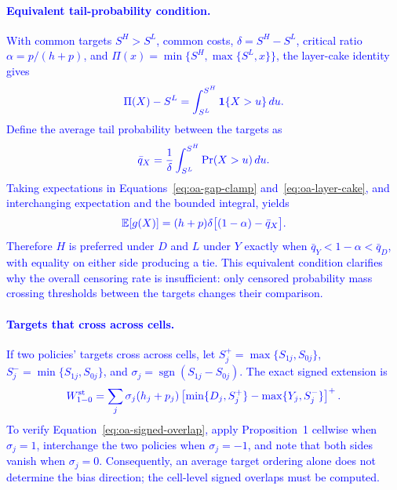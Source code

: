 \documentclass[msom,dblanonrev]{informs4}
\newcommand{\add}[1]{\textcolor{blue}{#1}}
\begin{document}
\paragraph{\add{Equivalent tail-probability condition.}}
\add{With common targets $S^H>S^L$, common costs, $\delta=S^H-S^L$, critical ratio $\alpha=p/(h+p)$, and $\Pi(x)=\min\{S^H,\max\{S^L,x\}\}$, the layer-cake identity gives}
\begin{equation}\label{eq:oa-layer-cake}
\add{\Pi(X)-S^L=\int_{S^L}^{S^H}\mathbf 1\{X>u\}\,du.}
\end{equation}
\add{Define the average tail probability between the targets as}
\begin{equation}\label{eq:oa-average-tail}
\add{\bar q_X=\frac{1}{\delta}\int_{S^L}^{S^H}\Pr(X>u)\,du.}
\end{equation}
\add{Taking expectations in Equations~\eqref{eq:oa-gap-clamp} and~\eqref{eq:oa-layer-cake}, and interchanging expectation and the bounded integral, yields}
\begin{equation}\label{eq:oa-tail-condition}
\add{\mathbb E[g(X)]=(h+p)\delta\bigl[(1-\alpha)-\bar q_X\bigr].}
\end{equation}
\add{Therefore $H$ is preferred under $D$ and $L$ under $Y$ exactly when $\bar q_Y<1-\alpha<\bar q_D$, with equality on either side producing a tie. This equivalent condition clarifies why the overall censoring rate is insufficient: only censored probability mass crossing thresholds between the targets changes their comparison.}

\paragraph{\add{Targets that cross across cells.}}
\add{If two policies' targets cross across cells, let $S_j^+=\max\{S_{1j},S_{0j}\}$, $S_j^-=\min\{S_{1j},S_{0j}\}$, and $\sigma_j=\operatorname{sgn}(S_{1j}-S_{0j})$. The exact signed extension is}
\begin{equation}\label{eq:oa-signed-overlap}
\add{W_{1-0}^{\mathrm{st}}=\sum_j\sigma_j(h_j+p_j)\left[\min\{D_j,S_j^+\}-\max\{Y_j,S_j^-\}\right]^+.}
\end{equation}
\add{To verify Equation~\eqref{eq:oa-signed-overlap}, apply Proposition~1 cellwise when $\sigma_j=1$, interchange the two policies when $\sigma_j=-1$, and note that both sides vanish when $\sigma_j=0$. Consequently, an average target ordering alone does not determine the bias direction; the cell-level signed overlaps must be computed.}
\end{document}
